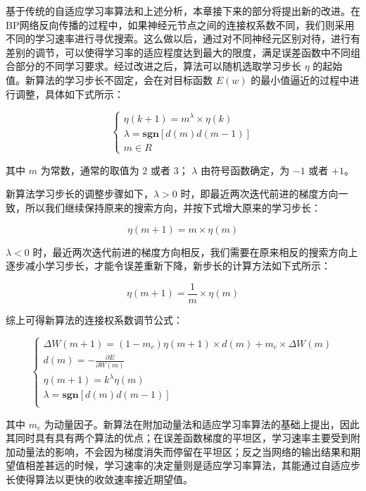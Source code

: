 \documentclass[UTF8]{ctexart}
\begin{document}
基于传统的自适应学习率算法和上述分析，本章接下来的部分将提出新的改进。在BP网络反向传播的过程中，如果神经元节点之间的连接权系数不同，我们则采用不同的学习速率进行寻优搜索。这么做以后，通过对不同神经元区别对待，进行有差别的调节，可以使得学习率的适应程度达到最大的限度，满足误差函数中不同组合部分的不同学习要求。经过改进之后，算法可以随机选取学习步长 $\eta$ 的起始值。新算法的学习步长不固定，会在对目标函数 $E(w)$ 的最小值逼近的过程中进行调整，具体如下式所示：

\begin{equation}
\begin{cases}
\eta (k+1) = m^{\lambda} \times \eta(k) \\
\lambda = \mathbf{sgn} [d(m) d(m-1)] \\
m \in R
\end{cases}
\end{equation}

其中 $m$ 为常数，通常的取值为 $2$ 或者 $3$； $\lambda$ 由符号函数确定，为 $-1$ 或者 $+1$。 \par

新算法学习步长的调整步骤如下，$\lambda > 0$ 时，即最近两次迭代前进的梯度方向一致，所以我们继续保持原来的搜索方向，并按下式增大原来的学习步长：

\begin{equation}
\eta(m+1) = m \times \eta(m)
\end{equation}

$\lambda < 0$ 时，最近两次迭代前进的梯度方向相反，我们需要在原来相反的搜索方向上逐步减小学习步长，才能令误差重新下降，新步长的计算方法如下式所示：

\begin{equation}
\eta(m+1) = \frac{1}{m} \times \eta(m)
\end{equation}

综上可得新算法的连接权系数调节公式：

\begin{equation}
\begin{cases}
\Delta W(m+1) = (1-m_c) \eta (m+1) \times d(m) + m_c \times \Delta W(m) \\
d(m) = - \frac{\partial E}{\partial W(m)} \\
\eta(m+1) = k^{\lambda} \eta (m) \\
\lambda = \mathbf{sgn} [d(m) d(m-1)] \\
\end{cases}
\end{equation}

其中 $m_c$ 为动量因子。新算法在附加动量法和适应学习率算法的基础上提出，因此其同时具有具有两个算法的优点；在误差函数梯度的平坦区，学习速率主要受到附加动量法的影响，不会因为梯度消失而停留在平坦区；反之当网络的输出结果和期望值相差甚远的时候，学习速率的决定量则是适应学习率算法，其能通过自适应步长使得算法以更快的收敛速率接近期望值。\par
\end{document}
